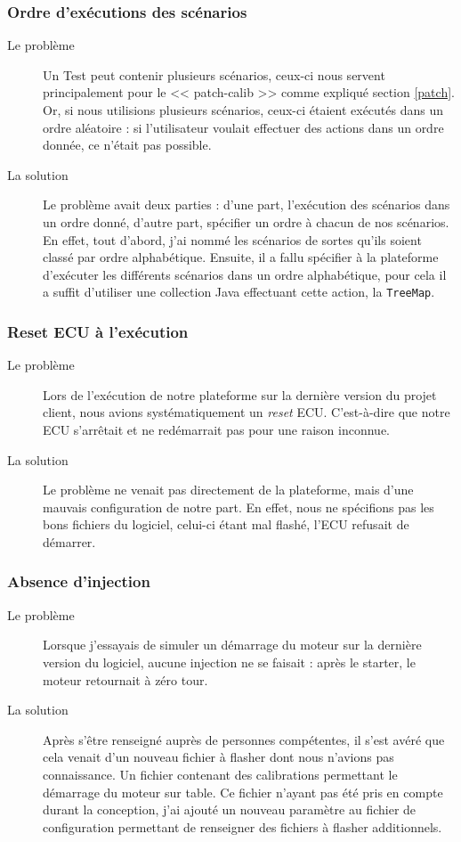 	\subsubsection{Ordre d'exécutions des scénarios}
		\begin{description}
			\item[Le problème] Un Test peut contenir plusieurs scénarios, ceux-ci nous servent principalement pour le << patch-calib >> comme expliqué section \ref{patch}. Or, si nous utilisions plusieurs scénarios, ceux-ci étaient exécutés dans un ordre aléatoire : si l'utilisateur voulait effectuer des actions dans un ordre donnée, ce n'était pas possible.
			\item[La solution] Le problème avait deux parties : d'une part, l'exécution des scénarios dans un ordre donné, d'autre part, spécifier un ordre à chacun de nos scénarios. En effet, tout d'abord, j'ai nommé les scénarios de sortes qu'ils soient classé par ordre alphabétique. Ensuite, il a fallu spécifier à la plateforme d'exécuter les différents scénarios dans un ordre alphabétique, pour cela il a suffit d'utiliser une collection Java effectuant cette action, la \texttt{TreeMap}.
	\end{description}
	
	\subsubsection{Reset ECU à l'exécution}
	\begin{description}
		\item[Le problème] Lors de l'exécution de notre plateforme sur la dernière version du projet client, nous avions systématiquement un \textit{reset} ECU. C'est-à-dire que notre ECU s'arrêtait et ne redémarrait pas pour une raison inconnue.
		\item[La solution] Le problème ne venait pas directement de la plateforme, mais d'une mauvais configuration de notre part. En effet, nous ne spécifions pas les bons fichiers du logiciel, celui-ci étant mal flashé, l'ECU refusait de démarrer.
	\end{description}
	
	\subsubsection{Absence d'injection}
	\begin{description}
		\item[Le problème] Lorsque j'essayais de simuler un démarrage du moteur sur la dernière version du logiciel, aucune injection ne se faisait : après le starter, le moteur retournait à zéro tour.
		\item[La solution] Après s'être renseigné auprès de personnes compétentes, il s'est avéré que cela venait d'un nouveau fichier à flasher dont nous n'avions pas connaissance. Un fichier contenant des calibrations permettant le démarrage du moteur sur table. Ce fichier n'ayant pas été pris en compte durant la conception, j'ai ajouté un nouveau paramètre au fichier de configuration permettant de renseigner des fichiers à flasher additionnels.
	\end{description}
	
